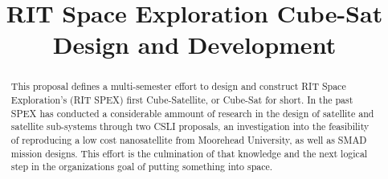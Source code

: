 \documentclass[conference]{IEEEtran} %
\title{RIT Space Exploration Cube-Sat Design and Development}
\author{
  \IEEEauthorblockN{%
    Evan Putnam\IEEEauthorrefmark{1},
  }
  \IEEEauthorblockA{%
    RIT Space Exploration, Rochester Institute of Technology \\ %
    Rochester, N.Y. \\
    Email:
    \IEEEauthorrefmark{1}emp9173@rit.edu,
  }

}
\begin{document}
\maketitle%

\begin{abstract}
This proposal defines a multi-semester effort to design and construct RIT Space Exploration's (RIT SPEX) first Cube-Satellite, or Cube-Sat for short.  In the past SPEX has conducted a considerable ammount of research in the design of satellite and satellite sub-systems through two CSLI proposals, an investigation into the feasibility of reproducing a low cost nanosatellite from Moorehead University, as well as SMAD mission designs.  This effort is the culmination of that knowledge and the next logical step in the organizations goal of putting something into space.

\end{abstract}

\label{sec:nomenclature}
\newcommand{\nomunit}[1]{%
\renewcommand{\nomentryend}{\hspace*{\fill}#1}}
\renewcommand{\nompreamble}{

  }
\printnomenclature{}
\end{document}
